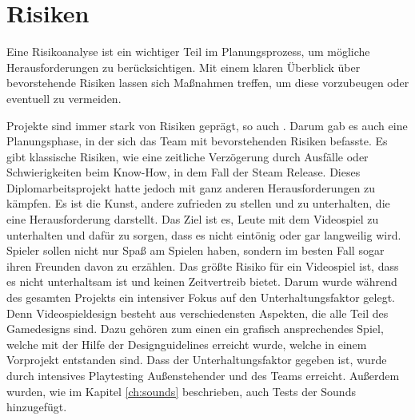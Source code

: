 
\section{Risiken}\label{sec:risiken}

\renewcommand{\kapitelautor}{Autor: Nils Hubmann}
%
Eine Risikoanalyse ist ein wichtiger Teil im Planungsprozess, um mögliche Herausforderungen zu berücksichtigen.
Mit einem klaren Überblick über bevorstehende Risiken lassen sich Maßnahmen treffen, um diese vorzubeugen oder eventuell zu vermeiden.

Projekte sind immer stark von Risiken geprägt, so auch \ff.
Darum gab es auch eine Planungsphase, in der sich das Team mit bevorstehenden Risiken befasste.
Es gibt klassische Risiken, wie eine zeitliche Verzögerung durch Ausfälle oder Schwierigkeiten beim Know-How, in dem Fall der Steam Release.
Dieses Diplomarbeitsprojekt hatte jedoch mit ganz anderen Herausforderungen zu kämpfen.
Es ist die Kunst, andere zufrieden zu stellen und zu unterhalten, die eine Herausforderung darstellt.
Das Ziel ist es, Leute mit dem Videospiel zu unterhalten und dafür zu sorgen, dass es nicht eintönig oder gar langweilig wird.
Spieler sollen nicht nur Spaß am Spielen haben, sondern im besten Fall sogar ihren Freunden davon zu erzählen.
Das größte Risiko für ein Videospiel ist, dass es nicht unterhaltsam ist und keinen Zeitvertreib bietet.
Darum wurde während des gesamten Projekts ein intensiver Fokus auf den Unterhaltungsfaktor gelegt.
Denn Videospieldesign besteht aus verschiedensten Aspekten, die alle Teil des Gamedesigns sind.
Dazu gehören zum einen ein grafisch ansprechendes Spiel, welche mit der Hilfe der Designguidelines erreicht wurde, welche in einem Vorprojekt entstanden sind.
Dass der Unterhaltungsfaktor gegeben ist, wurde durch intensives Playtesting Außenstehender und des Teams erreicht.
Außerdem wurden, wie im Kapitel \ref{ch:sounds} beschrieben, auch Tests der Sounds hinzugefügt.
%

\renewcommand{\kapitelautor}{}
